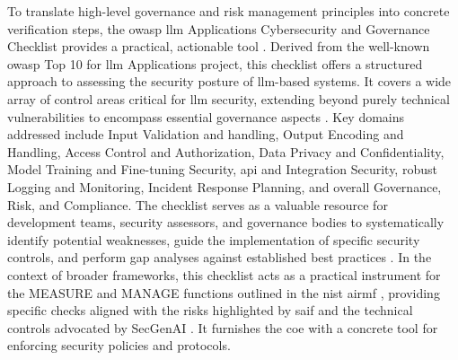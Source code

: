 To translate high-level governance and risk management principles into concrete verification steps, the \gls{owasp} \gls{llm} Applications Cybersecurity and Governance Checklist provides a practical, actionable tool \cite{editor_llm_nodate}. Derived from the well-known \gls{owasp} Top 10 for \gls{llm} Applications project, this checklist offers a structured approach to assessing the security posture of \gls{llm}-based systems. It covers a wide array of control areas critical for \gls{llm} security, extending beyond purely technical vulnerabilities to encompass essential governance aspects \cite{editor_llm_nodate}. Key domains addressed include Input Validation and handling, Output Encoding and Handling, Access Control and Authorization, Data Privacy and Confidentiality, Model Training and Fine-tuning Security, \gls{api} and Integration Security, robust Logging and Monitoring, Incident Response Planning, and overall Governance, Risk, and Compliance\cite{editor_llm_nodate}. The checklist serves as a valuable resource for development teams, security assessors, and governance bodies to systematically identify potential weaknesses, guide the implementation of specific security controls, and perform gap analyses against established best practices \cite{editor_llm_nodate}. In the context of broader frameworks, this checklist acts as a practical instrument for the MEASURE and MANAGE functions outlined in the \gls{nist} \gls{airmf} \cite{tabassi_artificial_2023}, providing specific checks aligned with the risks highlighted by \gls{saif} \cite{hansen_introducing_2023} and the technical controls advocated by SecGenAI \cite{haryanto_secgenai_2024}. It furnishes the \gls{coe}\cite{editor_llm_nodate} with a concrete tool for enforcing security policies and protocols.
